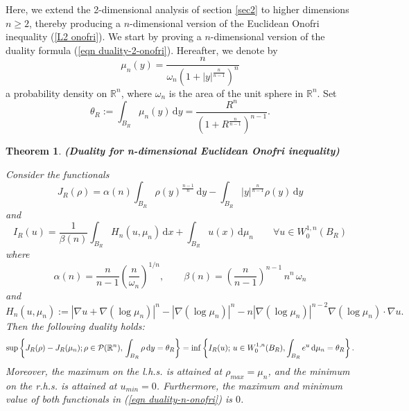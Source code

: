 \documentclass[10pt]{article}
\numberwithin{equation}{section}
\theoremstyle{plain}
\newtheorem{thm}{Theorem}[section]
\theoremstyle{definition}
\theoremstyle{remark}
\newcommand\R{{\mathbb R}}
\newcommand{\ib}{\int_{B_R}}
\newcommand\dd{\,\mbox{d} }
\begin{document}
Here, we extend the 2-dimensional analysis of section \ref{sec2} to higher dimensions $n\geq 2$, thereby producing a $n$-dimensional version of the Euclidean Onofri inequality (\ref{L2 onofri}). We start by proving a $n$-dimensional version of the duality formula (\ref{eqn duality-2-onofri}).  Hereafter, we denote by 
\[\mu_n(y)=\frac{n}{\omega_n(1+|y|^\frac{n}{n-1})^n}\]
 a probability density on $\R^n$, where $\omega_n$ is the area of the unit sphere in $\R^n$.
 Set 
\[\theta_R :=\ib \mu_n(y)\dd y = \frac{R^n}{(1+R^\frac{n}{n-1})^{n-1}}.\]

\begin{thm}{\bf (Duality for n-dimensional Euclidean Onofri inequality)} \label{theo n-duality}

Consider the functionals
\[J_R(\rho) = \alpha(n) \int_{B_R} \rho(y)^{\frac{n-1}{n}}\dd y - \int_{B_R} |y|^\frac{n}{n-1}\rho(y)\dd y \]
and
\[I_R(u)= \frac{1}{\beta(n)}\int_{B_R} H_n(u,\mu_n)\dd x + \int_{B_R} u(x)\dd\mu_n \qquad \forall u\in W^{1,n}_0(B_R)\]
where 
\[ \alpha(n)= \frac{n}{n-1}\left(\frac{n}{\omega_n}\right)^{1/n}, \qquad \beta(n)=\left(\frac{n}{n-1}\right)^{n-1}\, n^n\, \omega_n\]
and
\[H_n(u,\mu_n):=|\nabla u +\nabla(\log\mu_n)|^n - |\nabla(\log\mu_n)|^n - n |\nabla(\log\mu_n)|^{n-2}\nabla(\log\mu_n) \cdot \nabla u.\]
Then the following duality holds:
\begin{equation}\label{eqn duality-n-onofri}
\sup\left\{ J_R(\rho) - J_R(\mu_n); \rho \in {\cal P}(\R^n), \, \int_{B_R}\rho\dd y =\theta_R \right\} = \inf\left\{ I_R(u);\, u\in W^{1,n}_0(B_R),   \int_{B_R}e^u\dd\mu_n =\theta_R\right\}.
\end{equation}
Moreover, the maximum on the l.h.s. is attained at $\rho_{max}=\mu_n$, and the minimum on the r.h.s. is attained at $u_{min} = 0$. Furthermore, the maximum and minimum value of  both functionals in (\ref{eqn duality-n-onofri}) is $0$. 
\end{thm}
\end{document}
